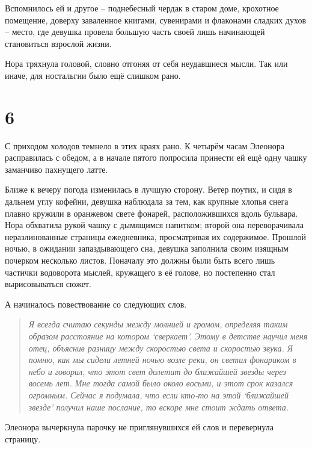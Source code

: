 \documentclass[
  a5paperpaper,
  DIV=11,
  numbers=noendperiod]{scrreprt}
\begin{document}
Вспомнилось ей и другое -- поднебесный чердак в старом доме, крохотное
помещение, доверху заваленное книгами, сувенирами и флаконами сладких
духов -- место, где девушка провела большую часть своей лишь начинающей
становиться взрослой жизни.

Нора тряхнула головой, словно отгоняя от себя неудавшиеся мысли. Так или
иначе, для ностальгии было ещё слишком рано.

\section*{6}\label{6}


С приходом холодов темнело в этих краях рано. К четырём часам Элеонора
расправилась с обедом, а в начале пятого попросила принести ей ещё одну
чашку заманчиво пахнущего латте.

Ближе к вечеру погода изменилась в лучшую сторону. Ветер поутих, и сидя
в дальнем углу кофейни, девушка наблюдала за тем, как крупные хлопья
снега плавно кружили в оранжевом свете фонарей, расположившихся вдоль
бульвара. Нора обхватила рукой чашку с дымящимся напитком; второй она
переворачивала неразлинованные страницы ежедневника, просматривая их
содержимое. Прошлой ночью, в ожидании запаздывающего сна, девушка
заполнила своим изящным почерком несколько листов. Поначалу это должны
были быть всего лишь частички водоворота мыслей, кружащего в её голове,
но постепенно стал вырисовываться сюжет.

А начиналось повествование со следующих слов.

\begin{quote}
\emph{Я всегда считаю секунды между молнией и громом, определяя таким
образом расстояние на котором `сверкает'. Этому в детстве научил меня
отец, объяснив разницу между скоростью света и скоростью звука. Я помню,
как мы сидели летней ночью возле реки, он светил фонариком в небо и
говорил, что этот свет долетит до ближайшей звезды через восемь лет. Мне
тогда самой было около восьми, и этот срок казался огромным. Сейчас я
подумала, что если кто-то на этой `ближайшей звезде' получил наше
послание, то вскоре мне стоит ждать ответа.}
\end{quote}

Элеонора вычеркнула парочку не приглянувшихся ей слов и перевернула
страницу.
\end{document}
